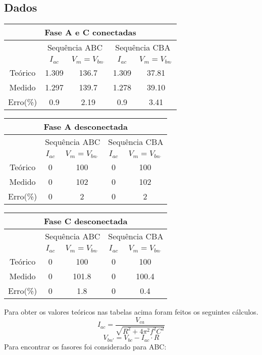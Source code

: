 \documentclass[a4paper, 12pt]{article}
\begin{document}
		\subsection{Dados}
			\begin{table}[H]
			\centering
				\begin{tabular}{|c|c|c|c|c|}
					\hline
					\multicolumn{5}{|c|}{Fase A e C conectadas }\\
					\hline
					& \multicolumn{2}{c|}{Sequência ABC} & \multicolumn{2}{c|}{Sequência CBA} \\ \hline
					& $I_{ac}$  & $V_m = V_{bn^,}$       & $I_{ac}$     & $V_m = V_{bn^,}$    \\ \hline
					Teórico  & 1.309 & 136.7 &    1.309 & 37.81  \\ \hline
					Medido   &    1.297 &   139.7      &  1.278     & 39.10   \\ \hline
					Erro(\%) & 0.9  &  2.19    &  0.9   & 3.41  \\ \hline
				\end{tabular}
			\end{table}
			\begin{table}[H]
			    \centering
				\begin{tabular}{|c|c|c|c|c|}
					\hline
					\multicolumn{5}{|c|}{Fase A desconectada }\\
					\hline
					& \multicolumn{2}{c|}{Sequência ABC} & \multicolumn{2}{c|}{Sequência CBA} \\ \hline
					& $I_{ac}$  & $V_m = V_{bn^,}$       & $I_{ac}$     & $V_m = V_{bn^,}$    \\ \hline
					Teórico  &   0& 100  & 0 &  100 \\ \hline
					Medido   & 0 & 102 & 0  & 102  \\ \hline
					Erro(\%) & 0 &   2   &  0   &  2 \\ \hline
				\end{tabular}
			\end{table}
			\begin{table}[H]
			    \centering
				\begin{tabular}{|c|c|c|c|c|}
					\hline
					\multicolumn{5}{|c|}{Fase C desconectada }\\
					\hline
					& \multicolumn{2}{c|}{Sequência ABC} & \multicolumn{2}{c|}{Sequência CBA} \\ \hline
					& $I_{ac}$  & $V_m = V_{bn^,}$       & $I_{ac}$     & $V_m = V_{bn^,}$    \\ \hline
					Teórico  &   0& 100  & 0 &  100 \\ \hline
					Medido   & 0 & 101.8 & 0  & 100.4  \\ \hline
					Erro(\%) & 0 &   1.8   &  0   & 0.4  \\ \hline
				\end{tabular}
			\end{table}
		    Para obter os valores teóricos nas tabelas acima foram feitos os seguintes cálculos.
		    \[I_{ac} = \frac{V_{ca}}{\sqrt{R^2+4\pi^2f^2C^2}}\]
		    \[ V_{bn'} = V_{bc} - I_{ac} \cdot R\]
		    Para encontrar os fasores foi considerado para ABC:
\end{document}
